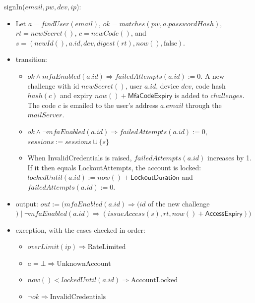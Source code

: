 \documentclass[12pt, titlepage]{article}
\begin{document}
\noindent signIn($\mathit{email}, \mathit{pw}, \mathit{dev}, \mathit{ip}$):
\begin{itemize}
\item Let $a = \mathit{findUser}(\mathit{email})$, $\mathit{ok} =
  \mathit{matches}(\mathit{pw}, a.\mathit{passwordHash})$, $\mathit{rt} =
  \mathit{newSecret}()$, $c = \mathit{newCode}()$, and $s =
  (\mathit{newId}(), a.\mathit{id}, \mathit{dev}, \mathit{digest}(\mathit{rt}),
  \mathit{now}(), \mathrm{false})$.
\item transition:
  \begin{itemize}
  \item $\mathit{ok} \wedge \mathit{mfaEnabled}(a.\mathit{id}) \Rightarrow
    \mathit{failedAttempts}(a.\mathit{id}) := 0$. A new challenge with id
    $\mathit{newSecret}()$, user $a.\mathit{id}$, device $\mathit{dev}$, code hash
    $\mathit{hash}(c)$ and expiry $\mathit{now}() + \textsf{MfaCodeExpiry}$ is
    added to $\mathit{challenges}$. The code $c$ is emailed to the user's
    address $a.\mathit{email}$ through the $\mathit{mailServer}$.
  \item $\mathit{ok} \wedge \neg \mathit{mfaEnabled}(a.\mathit{id}) \Rightarrow
    \mathit{failedAttempts}(a.\mathit{id}) := 0$, $\mathit{sessions} :=
    \mathit{sessions} \cup \{s\}$
  \item When InvalidCredentials is raised,
    $\mathit{failedAttempts}(a.\mathit{id})$ increases by 1. If it then equals
    \textsf{LockoutAttempts}, the account is locked:
    $\mathit{lockedUntil}(a.\mathit{id}) := \mathit{now}() +
    \textsf{LockoutDuration}$ and $\mathit{failedAttempts}(a.\mathit{id}) :=
    0$.
  \end{itemize}
\item output: $\mathit{out} := (\mathit{mfaEnabled}(a.\mathit{id})
  \Rightarrow (\mathit{id}$ of the new challenge$) \mid \neg
  \mathit{mfaEnabled}(a.\mathit{id}) \Rightarrow (\mathit{issueAccess}(s),
  \mathit{rt}, \mathit{now}() + \textsf{AccessExpiry}))$
\item exception, with the cases checked in order:
  \begin{itemize}
  \item $\mathit{overLimit}(\mathit{ip}) \Rightarrow \mathrm{RateLimited}$
  \item $a = \bot \Rightarrow \mathrm{UnknownAccount}$
  \item $\mathit{now}() < \mathit{lockedUntil}(a.\mathit{id}) \Rightarrow
    \mathrm{AccountLocked}$
  \item $\neg \mathit{ok} \Rightarrow \mathrm{InvalidCredentials}$
  \end{itemize}
\end{itemize}
\end{document}
